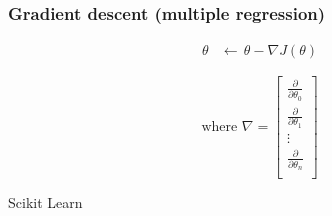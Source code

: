 \begin{frame}
  \frametitle{Gradient descent (multiple regression)}

  \begin{bphrase}
    \begin{align*}
      \theta & \leftarrow\, \theta - \nabla J(\theta)
    \end{align*}

    \begin{displaymath}
      \mbox{where } \nabla =
      \begin{bmatrix}
        \frac{\partial}{\partial\theta_0} \\[2mm]
        \frac{\partial}{\partial\theta_1} \\[2mm]
        \vdots\\[2mm]
        \frac{\partial}{\partial\theta_n} \\
      \end{bmatrix}
    \end{displaymath}
  \end{bphrase}
\end{frame}

\begin{frame}{Scikit Learn}
  
\end{frame}


